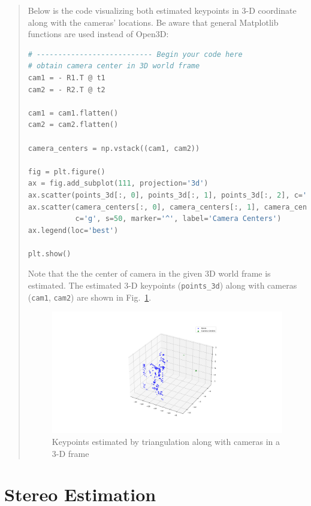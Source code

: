 \documentclass[11pt]{article}
\begin{document}
\begin{quote}
Below is the code visualizing both estimated keypoints in 3-D coordinate along with the cameras' locations. Be aware that general Matplotlib functions are used instead of Open3D:

\begin{lstlisting}[language=Python, basicstyle=\scriptsize]
# --------------------------- Begin your code here
# obtain camera center in 3D world frame
cam1 = - R1.T @ t1
cam2 = - R2.T @ t2

cam1 = cam1.flatten()
cam2 = cam2.flatten()

camera_centers = np.vstack((cam1, cam2))

fig = plt.figure()
ax = fig.add_subplot(111, projection='3d')
ax.scatter(points_3d[:, 0], points_3d[:, 1], points_3d[:, 2], c='b', label='Points')
ax.scatter(camera_centers[:, 0], camera_centers[:, 1], camera_centers[:, 2], \
           c='g', s=50, marker='^', label='Camera Centers')
ax.legend(loc='best')

plt.show()

\end{lstlisting}

Note that the the center of camera in the given 3D world frame is estimated. The estimated 3-D keypoints (\texttt{points\_3d}) along with cameras (\texttt{cam1}, \texttt{cam2}) are shown in Fig.~\ref{fig:triangulation}.

\begin{figure}[h]
    \centering
    \includegraphics[width=1.0\linewidth]{figs/triangulation.png}
    \caption{Keypoints estimated by triangulation along with cameras in a 3-D frame}
    \label{fig:triangulation}
\end{figure}

\end{quote}

\section*{Stereo Estimation}
\end{document}
